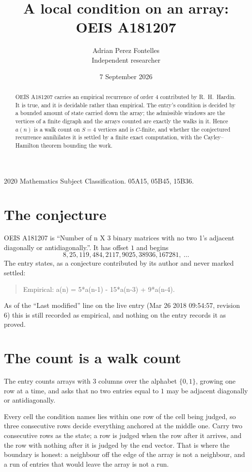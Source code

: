 \documentclass[11pt,a4paper]{article}
\title{A local condition on an array: OEIS A181207}
\author{Adrian Perez Fontelles\\ \small Independent researcher}
\date{7 September 2026}
\theoremstyle{plain}
\theoremstyle{definition}
\begin{document}
\maketitle

\begin{abstract}
OEIS A181207 carries an empirical recurrence of order $4$ contributed by R.~H.~Hardin. It is
true, and it is decidable rather than empirical. The entry's condition is decided by a bounded amount of state carried down the array; the
admissible windows are the vertices of a finite digraph and the arrays counted are exactly the
walks in it. Hence $a(n)$ is a walk count on $S=4$ vertices and is $C$-finite, and whether the
conjectured recurrence annihilates it is settled by a finite exact computation, with the
Cayley--Hamilton theorem bounding the work.
\end{abstract}

\noindent\small 2020 Mathematics Subject Classification. 05A15, 05B45, 15B36.\normalsize

\section{The conjecture}

OEIS A181207 is ``Number of n X 3 binary matrices with no two 1's adjacent diagonally or antidiagonally.''. It has offset $1$ and begins
\[
8, 25, 119, 484, 2117, 9025, 38936, 167281,\ \dots
\]
The entry states, as a conjecture contributed by its author and never marked settled:
\begin{quote}
Empirical: a(n) = 5*a(n-1) - 15*a(n-3) + 9*a(n-4).
\end{quote}
As of the ``Last modified'' line on the live entry (Mar 26 2018 09:54:57, revision 6) this is still
recorded as empirical, and nothing on the entry records it as proved.

\section{The count is a walk count}

The entry counts arrays with $3$ columns over the alphabet $\{0,1\}$, growing one row at a time, and asks that no two entries equal to $1$ may be adjacent diagonally or antidiagonally.

Every cell the condition names lies within one row of the cell being judged, so three consecutive rows decide everything anchored at the middle one. Carry two consecutive rows as the state; a row is judged when the row after it arrives, and the row with nothing after it is judged by the end vector. That is where the boundary is honest: a neighbour off the edge of the array is not a neighbour, and a run of entries that would leave the array is not a run.
\end{document}
